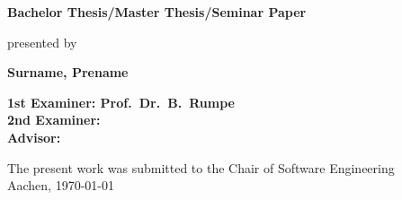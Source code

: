 \begin{titlepage}
\begin{flushleft}
{    {\Large \textbf{Bachelor Thesis/Master Thesis/Seminar Paper}\\}
		\vspace{3em} 
		
		{\large presented by\\} 
    
    {\LARGE \textbf{Surname, Prename}\\}
    \vspace{3em} 
		    
    {\Large \textbf{1st Examiner: Prof.\ Dr.\ B.\ Rumpe}\\}
    \vspace{1em} 
    {\Large \textbf{2nd Examiner: }\\}
    \vspace{1em} 
    {\Large \textbf{Advisor: }\\}
    \vspace{7em} 

    {\large The present work was submitted to the Chair of Software Engineering \\}
    \vspace{1em}
		{\large	Aachen, \today\\}
  }
\end{flushleft}

\end{titlepage}





